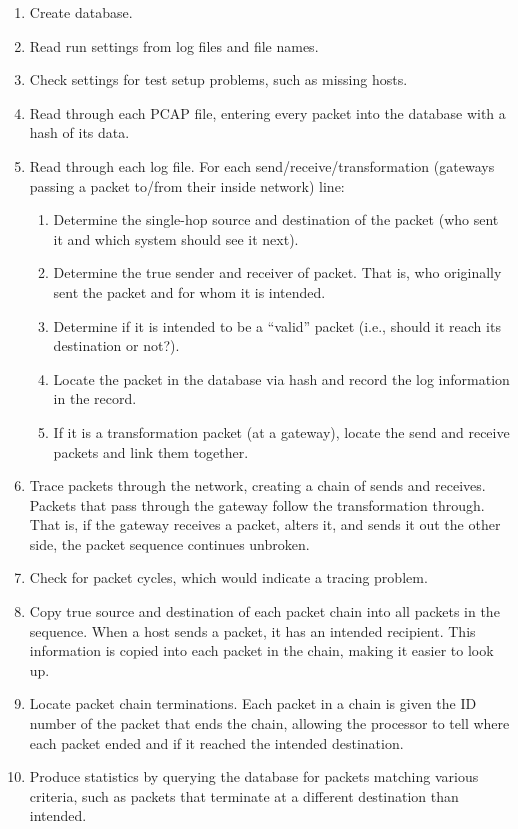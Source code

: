 \begin{enumerate}
\item Create database.
\item Read run settings from log files and file names.
\item Check settings for test setup problems, such as missing hosts.
\item Read through each \ac{PCAP} file, entering every packet into the database with a hash of its data.
\item Read through each log file. For each send/receive/transformation (gateways passing a packet to/from their inside network) line:
	\begin{enumerate}
	\item Determine the single-hop source and destination of the packet (who sent it and which system should see it next).
	\item Determine the true sender and receiver of packet. That is, who originally sent the packet and for whom it is intended.
	\item Determine if it is intended to be a ``valid'' packet (i.e., should it reach its destination or not?).
	\item Locate the packet in the database via hash and record the log information in the record.
	\item If it is a transformation packet (at a gateway), locate the send and receive packets and link them together.
	\end{enumerate}
\item Trace packets through the network, creating a chain of sends and receives. Packets that pass through the gateway follow the transformation through. That is, if the gateway receives a packet, alters it, and sends it out the other side, the packet sequence continues unbroken.
\item Check for packet cycles, which would indicate a tracing problem.
\item Copy true source and destination of each packet chain into all packets in the sequence. When a host sends a packet, it has an intended recipient. This information is copied into each packet in the chain, making it easier to look up.
\item Locate packet chain terminations. Each packet in a chain is given the ID number of the packet that ends the chain, allowing the processor to tell where each packet ended and if it reached the intended destination.
\item Produce statistics by querying the database for packets matching various criteria, such as packets that terminate at a different destination than intended.
\end{enumerate}


